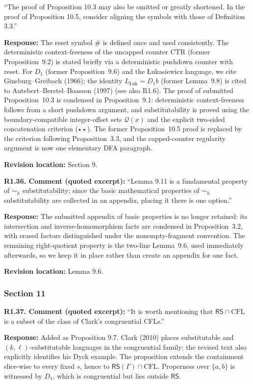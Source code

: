 \documentclass[
  10pt,
  a4paper,
]{article}
\begin{document}
``The proof of Proposition 10.3 may also be omitted or greatly
shortened. In the proof of Proposition 10.5, consider aligning the
symbols with those of Definition 3.3.''

\textbf{Response:} The reset symbol $\#$ is
defined once and used consistently.  The deterministic context-freeness
of the uncapped counter $\mathrm{CTR}$ (former Proposition~9.2) is
stated briefly via a deterministic pushdown counter with reset.  For
$D_1$ (former Proposition~9.6) and the \L{}ukasiewicz language, we cite
Ginsburg--Greibach (1966); the identity
$L_{\mathrm{Luk}}=D_1b$ (former Lemma~9.8) is cited to
Autebert--Berstel--Boasson (1997) (see also R1.6).
The proof of submitted Proposition~10.3 is condensed in Proposition~9.1:
deterministic context-freeness follows from a short pushdown argument,
and substitutability is proved using the boundary-compatible integer-offset
sets $\mathcal Q(x)$ and the explicit two-sided concatenation criterion
\textup{($\star\star$)}. The former
Proposition~10.5 proof is replaced by the criterion following
Proposition~3.3, and the capped-counter regularity argument is now one
elementary DFA paragraph.

\textbf{Revision location:} Section 9.


\textbf{R1.36. Comment (quoted excerpt):} ``Lemma 9.11 is a fundamental
property of \(\sim_h\) substitutability; since the basic mathematical
properties of \(\sim_h\) substitutability are collected in an appendix,
placing it there is one option.''

\textbf{Response:} The submitted appendix of basic properties is no longer
retained: its intersection and inverse-homomorphism facts are condensed in
Proposition~3.2, with erased factors distinguished under the
nonempty-fragment convention. The remaining right-quotient property is
the two-line Lemma~9.6, used immediately afterwards, so we keep it in place
rather than create an appendix for one fact.

\textbf{Revision location:} Lemma 9.6.


\subsubsection{Section 11}\label{section-11}

\textbf{R1.37. Comment (quoted excerpt):} ``It is worth mentioning that
\(\mathsf{RS}\cap\mathrm{CFL}\) is a subset of the class of
Clark's congruential CFLs.''

\textbf{Response:} Added as Proposition 9.7. Clark (2010) places substitutable and
$(k,\ell)$-substitutable languages in the congruential family; the revised
text also explicitly identifies his Dyck example. The proposition extends the
containment slice-wise to every fixed $s$, hence to
$\mathsf{RS}(\Gamma)\cap\mathrm{CFL}$. Properness over $\{a,b\}$ is
witnessed by $D_1$, which is congruential but lies outside $\mathsf{RS}$.
\end{document}
